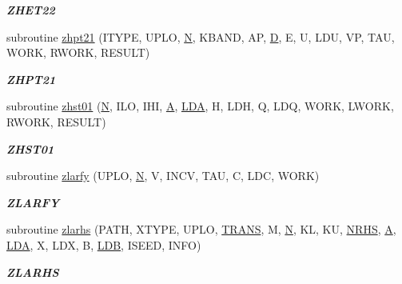 \begin{DoxyCompactItemize}
\begin{DoxyCompactList}\small\item\em {\bfseries Z\+H\+E\+T22} \end{DoxyCompactList}\item 
subroutine \hyperlink{group__complex16__eig_gacb29438aa9a7dd450f3db905ef4a8daa}{zhpt21} (I\+T\+Y\+P\+E, U\+P\+L\+O, \hyperlink{polmisc_8c_a0240ac851181b84ac374872dc5434ee4}{N}, K\+B\+A\+N\+D, A\+P, \hyperlink{odrpack_8h_a7dae6ea403d00f3687f24a874e67d139}{D}, E, U, L\+D\+U, V\+P, T\+A\+U, W\+O\+R\+K, R\+W\+O\+R\+K, R\+E\+S\+U\+L\+T)
\begin{DoxyCompactList}\small\item\em {\bfseries Z\+H\+P\+T21} \end{DoxyCompactList}\item 
subroutine \hyperlink{group__complex16__eig_ga0fb275b7e7ca95861483e96a8865baeb}{zhst01} (\hyperlink{polmisc_8c_a0240ac851181b84ac374872dc5434ee4}{N}, I\+L\+O, I\+H\+I, \hyperlink{classA}{A}, \hyperlink{example__user_8c_ae946da542ce0db94dced19b2ecefd1aa}{L\+D\+A}, H, L\+D\+H, Q, L\+D\+Q, W\+O\+R\+K, L\+W\+O\+R\+K, R\+W\+O\+R\+K, R\+E\+S\+U\+L\+T)
\begin{DoxyCompactList}\small\item\em {\bfseries Z\+H\+S\+T01} \end{DoxyCompactList}\item 
subroutine \hyperlink{group__complex16__eig_ga817c8e2419ed8d953bad714eb82d4c54}{zlarfy} (U\+P\+L\+O, \hyperlink{polmisc_8c_a0240ac851181b84ac374872dc5434ee4}{N}, V, I\+N\+C\+V, T\+A\+U, C, L\+D\+C, W\+O\+R\+K)
\begin{DoxyCompactList}\small\item\em {\bfseries Z\+L\+A\+R\+F\+Y} \end{DoxyCompactList}\item 
subroutine \hyperlink{group__complex16__eig_gadf62e94d7d1eba45c66a510ca52f9802}{zlarhs} (P\+A\+T\+H, X\+T\+Y\+P\+E, U\+P\+L\+O, \hyperlink{superlu__enum__consts_8h_a0c4e17b2d5cea33f9991ccc6a6678d62a1f61e3015bfe0f0c2c3fda4c5a0cdf58}{T\+R\+A\+N\+S}, M, \hyperlink{polmisc_8c_a0240ac851181b84ac374872dc5434ee4}{N}, K\+L, K\+U, \hyperlink{example__user_8c_aa0138da002ce2a90360df2f521eb3198}{N\+R\+H\+S}, \hyperlink{classA}{A}, \hyperlink{example__user_8c_ae946da542ce0db94dced19b2ecefd1aa}{L\+D\+A}, X, L\+D\+X, B, \hyperlink{example__user_8c_a50e90a7104df172b5a89a06c47fcca04}{L\+D\+B}, I\+S\+E\+E\+D, I\+N\+F\+O)
\begin{DoxyCompactList}\small\item\em {\bfseries Z\+L\+A\+R\+H\+S} \end{DoxyCompactList}\item 

\end{DoxyCompactItemize}
